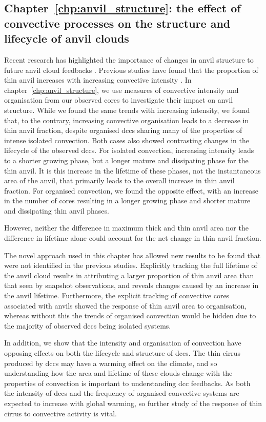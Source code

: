 \subsection{Chapter~\ref{chp:anvil_structure}: the effect of convective processes on the structure and lifecycle of anvil clouds}

Recent research has highlighted the importance of changes in anvil structure to future anvil cloud feedbacks \citep{mckim_weak_2024, sokol_greater_2024}.
Previous studies have found that the proportion of thin anvil increases with increasing convective intensity \citep{protopapadaki_upper_2017, takahashi_relationships_2017}.
In chapter~\ref{chp:anvil_structure}, we use measures of convective intensity and organisation from our observed cores to investigate their impact on anvil structure.
While we found the same trends with increasing intensity, we found that, to the contrary, increasing convective organisation leads to a decrease in thin anvil fraction, despite organised \acrshort{dcc}s sharing many of the properties of intense isolated convection.
Both cases also showed contrasting changes in the lifecycle of the observed \acrshort{dcc}s.
For isolated convection, increasing intensity leads to a shorter growing phase, but a longer mature and dissipating phase for the thin anvil.
It is this increase in the lifetime of these phases, not the instantaneous area of the anvil, that primarily leads to the overall increase in thin anvil fraction.
For organised convection, we found the opposite effect, with an increase in the number of cores resulting in a longer growing phase and shorter mature and dissipating thin anvil phases.

However, neither the difference in maximum thick and thin anvil area nor the difference in lifetime alone could account for the net change in thin anvil fraction.

 
The novel approach used in this chapter has allowed new results to be found that were not identified in the previous studies.
Explicitly tracking the full lifetime of the anvil cloud results in attributing a larger proportion of thin anvil area than that seen by snapshot observations, and reveals changes caused by an increase in the anvil lifetime.
Furthermore, the explicit tracking of convective cores associated with anvils showed the response of thin anvil area to organisation, whereas without this the trends of organised convection would be hidden due to the majority of observed \acrshort{dcc}s being isolated systems.

In addition, we show that the intensity and organisation of convection have opposing effects on both the lifecycle and structure of \acrshort{dcc}s. 
The thin cirrus produced by \acrshort{dcc}s may have a warming effect on the climate, and so understanding how the area and lifetime of these clouds change with the properties of convection is important to understanding \acrshort{dcc} feedbacks. 
As both the intensity of \acrshort{dcc}s and the frequency of organised convective systems are expected to increase with global warming, so further study of the response of thin cirrus to convective activity is vital.

